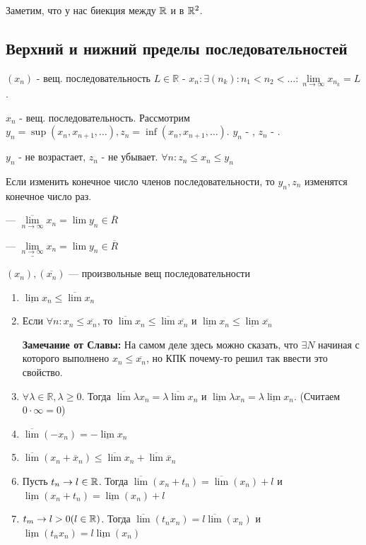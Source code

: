 Заметим, что у нас биекция между $\mathbb{R}$ и в $\mathbb{R}^2$. 

\newpage
\subsection{Верхний и нижний пределы последовательностей}

 $(x_n)$ - вещ. последовательность $L\in \mathbb{R}$ -  $x_n: \exists (n_k):n_1<n_2<\ldots: \lim\limits_{n\rightarrow \infty} x_{n_k}=L$.

 $x_n$ - вещ. последовательность. Рассмотрим $y_n = \sup (x_n, x_{n+1},\ldots),z_n = \inf(x_n,x_{n+1},\ldots)$. $y_n$ - , $z_n$ - . 

$y_n$ - не возрастает, $z_n$ - не убывает. $\forall n: z_n\leq x_n \leq y_n$

Если изменить конечное число членов последовательности, то $y_n,z_n$ изменятся конечное число раз.

--- $\overline{\lim\limits_{n\rightarrow \infty}}x_n=\lim y_n \in \overline{R}$

--- $\underline{\lim\limits_{n\rightarrow \infty}}x_n=\lim y_n \in \overline{R}$


$(x_n), (\overline{x_n})$ --- произвольные вещ последовательности

\begin{enumerate}
    \item $\underline{\lim}x_n \leq \overline{\lim }x_n$
    \item Если $\forall n : x_n \leq \overline{x_n}$, то $\overline{\lim} x_n\leq \overline{\lim} \overline{x_n}$ и $\underline{\lim} x_n\leq \underline{\lim} \overline{x_n}$
    
    \textbf{Замечание от Славы:} На самом деле здесь можно сказать, что $\exists N$ начиная с которого выполнено $x_n \leq \overline{x_n}$, но КПК почему-то решил так ввести это свойство.

    \item $\forall \lambda \in\mathbb{R}, \lambda\geq 0$. Тогда $\overline{\lim}\lambda x_n = \lambda \overline{\lim} x_n$ и $\underline{\lim}\lambda x_n = \lambda \underline{\lim} x_n$. (Считаем $0 \cdot \infty = 0$)
    \item $\overline{\lim}(-x_n)= - \underline{\lim}x_n$
    \item $\overline{\lim }(x_n + \overline{x}_n) \leq \overline{\lim }  {x}_n + \overline{\lim }\overline{x}_n $
    \item Пусть $t_n \rightarrow l \in \mathbb{R}$. Тогда $\overline{\lim}(x_n + t_n) = \overline{\lim} (x_n) + l $ и $\underline{\lim}(x_n + t_n) = \underline{\lim} (x_n) + l $
    \item $t_m \rightarrow l>0 (l\in \mathbb{R})$. Тогда $\overline{\lim} (t_nx_n) =l  \overline{\lim} (x_n)$ и  $\underline{\lim} (t_nx_n) =l  \underline{\lim} (x_n)$
\end{enumerate}

